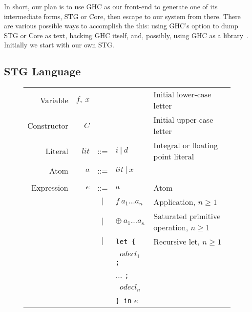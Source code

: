 \documentclass{llncs}
\begin{document}
In short, our plan is to use GHC as our front-end to generate one of its
intermediate forms, STG or Core, then escape to our system from there.  There
are various possible ways to accomplish the this: using GHC's option to dump
STG or Core as text, hacking GHC itself, and, possibly, using GHC as a
library~\cite{ghc-as-library}.  Initially we start with our own STG.

\subsection{STG Language}

\setlength{\tabcolsep}{5pt}
\begin{figure}
\centering
\footnotesize %
\begin{tabular}{r r c l l}
Variable     & $f,\ x$        &     &                                              & Initial lower-case letter \\
Constructor  & $C$            &     &                                              & Initial upper-case letter \\
Literal      & $\mathit{lit}$ & ::= & $i\ |\ d$                                    & Integral or floating point literal \\
Atom         & $a$            & ::= & $\mathit{lit}\ |\ x$                         & \\ %
\\
Expression   & $e$            & ::= & $a$                                          & Atom \\
             &                & $|$ & $f\ a_1\dots a_n$                            & Application, $n\ge 1$ \\
             &                & $|$ & $\oplus\ a_1\dots a_n$                       & Saturated primitive operation, $n\ge 1$ \\

             &                & $|$ & \texttt{let \{}                              & Recursive let, $n\ge 1$ \\
             &                &     & \texttt{ } $\mathit{odecl}_1$ \texttt{;} \\
             &                &     & \hspace{0.2in} $\dots$ \texttt{;} \\
             &                &     & \texttt{ } $\mathit{odecl}_n$ \\
             &                &     & \texttt{\} in} $e$  \\


\end{tabular}
\end{figure}
\end{document}
